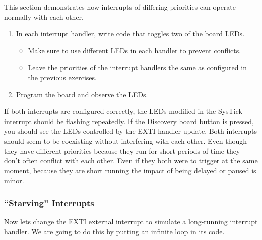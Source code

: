 \documentclass[11pt,fleqn]{book} %
\begin{document}
This section demonstrates how interrupts of differing priorities can operate normally with each other. 

\begin{enumerate}
    \item In each interrupt handler, write code that toggles two of the board LEDs.
    \begin{itemize}
        \item Make sure to use different LEDs in each handler to prevent conflicts.
        \item Leave the priorities of the interrupt handlers the same as configured in the previous exercises.
    \end{itemize}
    \item Program the board and observe the LEDs.
\end{enumerate}

 If both interrupts are configured correctly, the LEDs modified in the SysTick interrupt should be flashing repeatedly. If the Discovery board button is pressed, you should see the LEDs controlled by the EXTI handler update. Both interrupts should seem to be coexisting without interfering with each other. Even though they have different priorities because they run for short periods of time they don't often conflict with each other. Even if they both were to trigger at the same moment, because they are short running the impact of being delayed or paused is minor. 

\subsubsection{``Starving'' Interrupts}
Now lets change the EXTI external interrupt to simulate a long-running interrupt handler. We are going to do this by putting an infinite loop in its code. 
\end{document}
